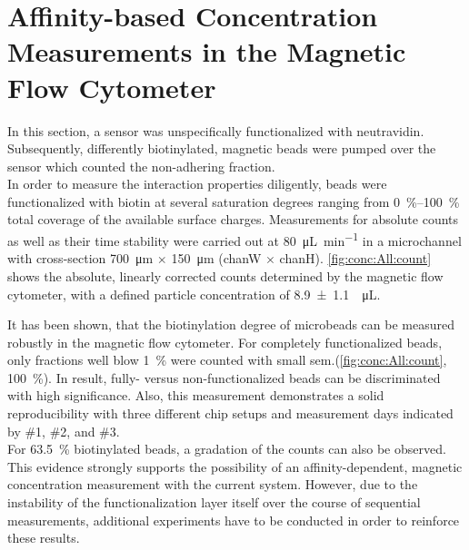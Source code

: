 \section{Affinity-based Concentration Measurements in the Magnetic Flow Cytometer}
\label{sec:res:affinity}
In this section, a sensor was unspecifically functionalized with neutravidin. Subsequently, differently biotinylated, magnetic beads were pumped over the sensor which counted the non-adhering fraction.\\
In order to measure the interaction properties diligently, beads were functionalized with biotin at several saturation degrees ranging from \SIrange{0}{100}{\percent} total coverage of the available surface charges. Measurements for absolute counts as well as their time stability were carried out at \SI{80}{\micro\liter\per\minute} in a microchannel with cross-section \SI{700}{\micro\meter} $\times$ \SI{150}{\micro\meter}  (\gls{chanW} $\times$ \gls{chanH}). \cref{fig:conc:All:count} shows the absolute, linearly corrected counts determined by the magnetic flow cytometer, with a defined particle concentration of \SI{8.9+-1.1}{\per\micro\liter}.

It has been shown, that the biotinylation degree of microbeads can be measured robustly in the magnetic flow cytometer. For completely functionalized beads, only fractions well blow \SI{1}{\percent} were counted with small \gls{sem}.(\cref{fig:conc:All:count}, \SI{100}{\percent}). In result, fully- versus non-functionalized beads can be discriminated with high significance. Also, this measurement demonstrates a solid reproducibility with three different chip setups and measurement days indicated by \#1, \#2, and \#3.\\
For \SI{63.5}{\percent} biotinylated beads, a gradation of the counts can also be observed. This evidence strongly supports the possibility of an affinity-dependent, magnetic concentration measurement with the current system. However, due to the instability of the functionalization layer itself over the course of sequential measurements, additional experiments have to be conducted in order to reinforce these results.

